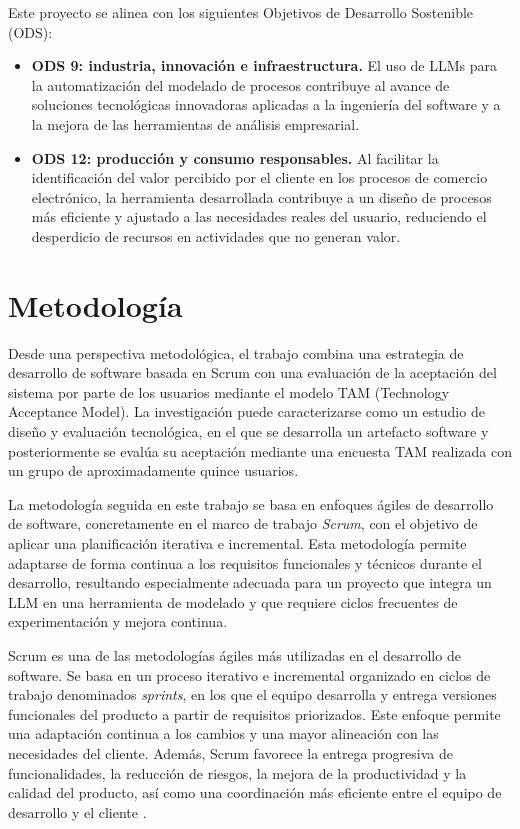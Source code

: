 Este proyecto se alinea con los siguientes Objetivos de Desarrollo Sostenible (ODS):

\begin{itemize}
    \item[$\bullet$] \textbf{ODS 9: industria, innovación e infraestructura.} El uso de LLMs para la automatización del modelado de procesos contribuye al avance de soluciones tecnológicas innovadoras aplicadas a la ingeniería del software y a la mejora de las herramientas de análisis empresarial.
    \item[$\bullet$] \textbf{ODS 12: producción y consumo responsables.} Al facilitar la identificación del valor percibido por el cliente en los procesos de comercio electrónico, la herramienta desarrollada contribuye a un diseño de procesos más eficiente y ajustado a las necesidades reales del usuario, reduciendo el desperdicio de recursos en actividades que no generan valor.
\end{itemize}

\section{Metodología}

Desde una perspectiva metodológica, el trabajo combina una estrategia de desarrollo de software basada en Scrum con una evaluación de la aceptación del
sistema por parte de los usuarios mediante el modelo TAM (Technology Acceptance Model). La investigación
puede caracterizarse como un estudio de diseño y evaluación tecnológica, en el que se desarrolla un artefacto
software y posteriormente se evalúa su aceptación mediante una encuesta TAM realizada con un grupo de
aproximadamente quince usuarios.

La metodología seguida en este trabajo se basa en enfoques ágiles de desarrollo de software, concretamente en el marco de trabajo \textit{Scrum}, con el objetivo de aplicar una planificación iterativa e incremental. Esta metodología permite adaptarse de forma continua a los requisitos funcionales y técnicos durante el desarrollo, resultando especialmente adecuada para un proyecto que integra un LLM en una herramienta de modelado y que requiere ciclos frecuentes de experimentación y mejora continua.

Scrum es una de las metodologías ágiles más utilizadas en el desarrollo de software. Se basa en un proceso iterativo e incremental organizado en ciclos de trabajo denominados \textit{sprints}, en los que el equipo desarrolla y entrega versiones funcionales del producto a partir de requisitos priorizados. Este enfoque permite una adaptación continua a los cambios y una mayor alineación con las necesidades del cliente. Además, Scrum favorece la entrega progresiva de funcionalidades, la reducción de riesgos, la mejora de la productividad y la calidad del producto, así como una coordinación más eficiente entre el equipo de desarrollo y el cliente \cite{riano2021}.

